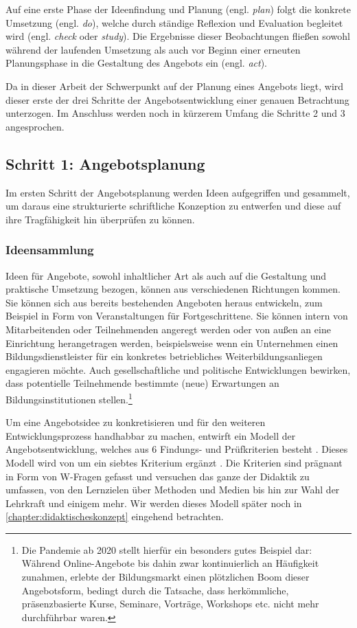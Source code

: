 \documentclass[
  twoside,
  parskip=half-,
]{scrreprt}
\begin{document}
Auf eine erste Phase der Ideenfindung und Planung (engl. \textit{plan}) folgt die konkrete Umsetzung (engl. \textit{do}), welche durch ständige Reflexion und Evaluation begleitet wird (engl. \textit{check} oder \textit{study}). Die Ergebnisse dieser Beobachtungen fließen sowohl während der laufenden Umsetzung als auch vor Beginn einer erneuten Planungsphase in die Gestaltung des Angebots ein (engl. \textit{act}).

Da in dieser Arbeit der Schwerpunkt auf der Planung eines Angebots liegt, wird dieser erste der drei Schritte der Angebotsentwicklung einer genauen Betrachtung unterzogen. Im Anschluss werden noch in kürzerem Umfang die Schritte 2 und 3 angesprochen.

\subsection{Schritt 1: Angebotsplanung}

Im ersten Schritt der Angebotsplanung werden Ideen aufgegriffen und gesammelt, um daraus eine strukturierte schriftliche Konzeption zu entwerfen und diese auf ihre Tragfähigkeit hin überprüfen zu können.

\subsubsection{Ideensammlung} Ideen für Angebote, sowohl inhaltlicher Art als auch auf die Gestaltung und praktische Umsetzung bezogen, können aus verschiedenen Richtungen kommen. Sie können sich aus bereits bestehenden Angeboten heraus entwickeln, zum Beispiel in Form von Veranstaltungen für Fortgeschrittene. Sie können intern von Mitarbeitenden oder Teilnehmenden angeregt werden oder von außen an eine Einrichtung herangetragen werden, beispielsweise wenn ein Unternehmen einen Bildungsdienstleister für ein konkretes betriebliches Weiterbildungsanliegen engagieren möchte. Auch gesellschaftliche und politische Entwicklungen bewirken, dass potentielle Teilnehmende bestimmte (neue) Erwartungen an Bildungsinstitutionen stellen.\footnote{Die Pandemie ab 2020 stellt hierfür ein besonders gutes Beispiel dar: Während Online-Angebote bis dahin zwar kontinuierlich an Häufigkeit zunahmen, erlebte der Bildungsmarkt einen plötzlichen Boom dieser Angebotsform, bedingt durch die Tatsache, dass herkömmliche, präsenzbasierte Kurse, Seminare, Vorträge, Workshops etc. nicht mehr durchführbar waren.}

Um eine Angebotsidee zu konkretisieren und für den weiteren Entwicklungsprozess handhabbar zu machen, entwirft \citeauthor{schlutz} ein Modell der Angebotsentwicklung, welches aus 6 Findungs- und Prüfkriterien besteht \autocite[vgl.][78]{schlutz}. Dieses Modell wird von \citeauthor{fleige} um ein siebtes Kriterium ergänzt \autocite[vgl.][127]{fleige}. Die Kriterien sind prägnant in Form von W-Fragen gefasst und versuchen das ganze  der Didaktik zu umfassen, von den Lernzielen über Methoden und Medien bis hin zur Wahl der Lehrkraft und einigem mehr. Wir werden dieses Modell später noch in \autoref{chapter:didaktischeskonzept} eingehend betrachten.
\end{document}
